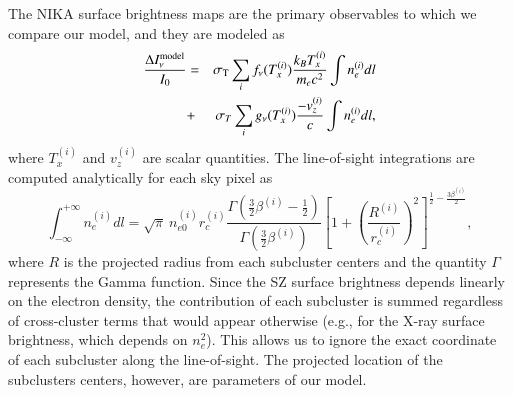\documentclass[twocolumn,traditabstract]{aa}
\begin{document}
The NIKA surface brightness maps are the primary observables to which we compare our model, and they are modeled as
\begin{eqnarray}
\frac{\Delta I_{\nu}^{\rm model}}{I_0} & = & \sigma_{\rm T} \sum\limits_{i} f_{\nu}(T_x^{(i)}) \frac{k_B T_x^{(i)}}{m_e c^2} \int n_e^{(i)} dl \nonumber \\
       & + & \sigma_T \sum\limits_{i} g_{\nu}(T_x^{(i)}) \frac{-v_z^{(i)}}{c} \int n_e^{(i)} dl, \nonumber \\	        
\label{eq:Inu_model}
\end{eqnarray}
where $T_x^{(i)}$ and $v_z^{(i)}$ are scalar quantities. The line-of-sight integrations are computed analytically for each sky pixel as
\begin{equation}
	\int^{+\infty}_{-\infty} n_e^{(i)} dl = \sqrt{\pi} \ n_{e0}^{(i)} r_c^{(i)}\frac{\Gamma\left(\frac{3}{2} \beta^{(i)} -\frac{1}{2}\right)}{\Gamma\left(\frac{3}{2} \beta^{(i)}\right)} \left[1+\left(\frac{R^{(i)}}{r_c^{(i)}}\right)^2 \right]^{\frac{1}{2}-\frac{3 \beta^{(i)}}{2}},
\label{eq:beta_model_integ}
\end{equation}
where $R$ is the projected radius from each subcluster centers and the quantity $\Gamma$ represents the Gamma function. Since the SZ surface brightness depends linearly on the electron density, the contribution of each subcluster is summed regardless of cross-cluster terms that would appear otherwise (e.g., for the X-ray surface brightness, which depends on $n_e^2$). This allows us to ignore the exact coordinate of each subcluster along the line-of-sight. The projected location of the subclusters centers, however, are parameters of our model.

\end{document}
